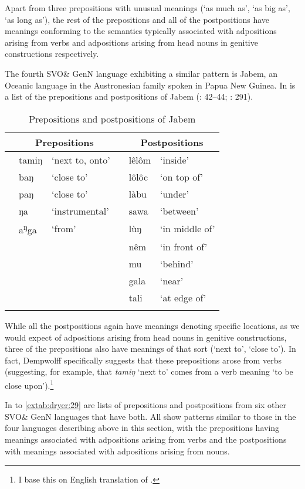 \documentclass[output=paper]{langsci/langscibook}
\begin{document}
Apart from three prepositions with unusual meanings (‘as much as’, ‘as big as’, ‘as long as’), the rest of the prepositions and all of the postpositions have meanings conforming to the semantics typically associated with adpositions arising from verbs and adpositions arising from head nouns in genitive constructions respectively.

The fourth SVO\& GenN language exhibiting a similar pattern is Jabem, an Oceanic language in the Austronesian family spoken in Papua New Guinea. In  is a list of the prepositions and postpositions of Jabem (\citealt{Dempwolff1939,BradshawCzobor2005}: 42–44; \citealt{Ross2002}: 291).

\begin{table}
\caption{Prepositions and postpositions of Jabem }
\label{extab:dryer:23}
\begin{tabularx}{\textwidth}{lll lll} 
\lsptoprule
 & \multicolumn{2}{c}{\bfseries Prepositions} &  & \multicolumn{2}{c}{\bfseries Postpositions}\\
\midrule
 & tamiŋ & ‘next to, onto’ &  & lêlôm & ‘inside’\\
 & baŋ & ‘close to’ &  & lôlôc & ‘on top of’\\
 & paŋ & ‘close to’ &  & làbu & ‘under’\\
 & ŋa & ‘instrumental’ &  & sawa & ‘between’\\
 & a\textsuperscript{ŋ}ga & ‘from’ &  & lùŋ & ‘in middle of’\\
 &  &  &  & nêm & ‘in front of’\\
 &  &  &  & mu & ‘behind’\\
 &  &  &  & gala & ‘near’\\
 &  &  &  & tali & ‘at edge of’\\
\lspbottomrule
\end{tabularx}
\end{table}

While all the postpositions again have meanings denoting specific locations, as we would expect of adpositions arising from head nouns in genitive constructions, three of the prepositions also have meanings of that sort (‘next to’, ‘close to’). In fact, Dempwolff specifically suggests that these prepositions arose from verbs (suggesting, for example, that \textit{tamiŋ} ‘next to’ comes from a verb meaning ‘to be close upon’).\footnote{I base this on  English translation of \citet{Dempwolff1939}.}

In  to \ref{extab:dryer:29} are lists of prepositions and postpositions from six other SVO\& GenN languages that have both. All show patterns similar to those in the four languages describing above in this section, with the prepositions having meanings associated with adpositions arising from verbs and the postpositions with meanings associated with adpositions arising from nouns.
\end{document}
